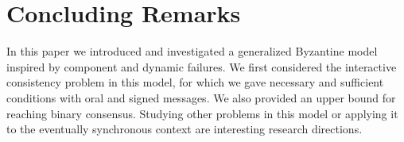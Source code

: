 
\section{Concluding Remarks}

In this paper we introduced and investigated a generalized Byzantine model inspired by component and dynamic failures. We first considered the interactive
consistency problem in this model, for which we gave 
necessary and sufficient conditions with
oral and signed messages. We also provided an upper bound for reaching binary consensus. 
Studying other problems in this model or applying it to the eventually synchronous 
context are interesting research directions. 

%

